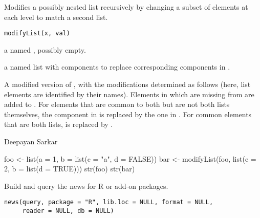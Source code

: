 %
\begin{Description}\relax
Modifies a possibly nested list recursively by changing a subset of
elements at each level to match a second list.
\end{Description}
%
\begin{Usage}
\begin{verbatim}
modifyList(x, val)
\end{verbatim}
\end{Usage}
%
\begin{Arguments}
\begin{ldescription}
\item[\code{x}] a named , possibly empty.
\item[\code{val}] a named list with components to replace corresponding
components in .
\end{ldescription}
\end{Arguments}
%
\begin{Value}
A modified version of , with the modifications determined as
follows (here, list elements are identified by their names).  Elements
in  which are missing from  are added to .
For elements that are common to both but are not both lists
themselves, the component in  is replaced by the one in
.  For common elements that are both lists, 
is replaced by .
\end{Value}
%
\begin{Author}\relax
 Deepayan Sarkar 
\end{Author}
%
\begin{Examples}
\begin{ExampleCode}
foo <- list(a = 1, b = list(c = "a", d = FALSE))
bar <- modifyList(foo, list(e = 2, b = list(d = TRUE)))
str(foo)
str(bar)
\end{ExampleCode}
\end{Examples}
%
\begin{Description}\relax
Build and query the news for R or add-on packages.
\end{Description}
%
\begin{Usage}
\begin{verbatim}
news(query, package = "R", lib.loc = NULL, format = NULL,
     reader = NULL, db = NULL)
\end{verbatim}
\end{Usage}
